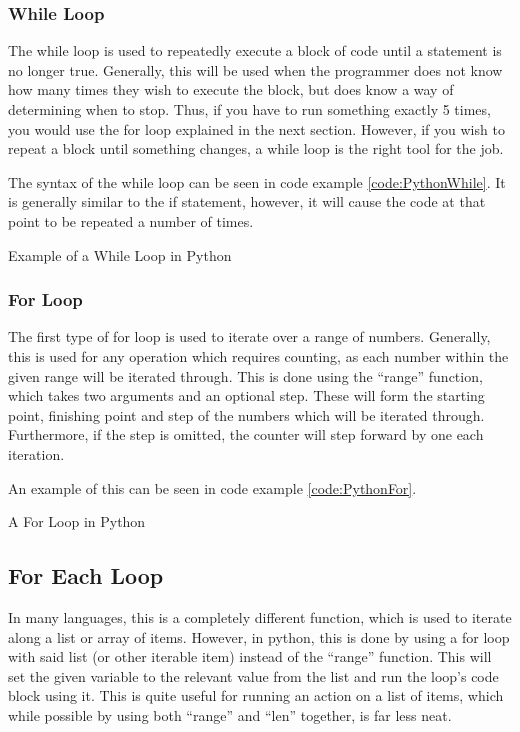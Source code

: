 			\subsubsection{While Loop}
				The while loop is used to repeatedly execute a block of code until a statement is no longer true.
				Generally, this will be used when the programmer does not know how many times they wish to execute the block,
				but does know a way of determining when to stop.
				Thus, if you have to run something exactly 5 times, you would use the for loop explained in the next section.
				However, if you wish to repeat a block until something changes, a while loop is the right tool for the job.

				The syntax of the while loop can be seen in code example \ref{code:PythonWhile}.
				It is generally similar to the if statement, however, it will cause the code at that point to be repeated a number of times.
				\begin{code}
					\caption{Example of a While Loop in Python}
					\label{code:PythonWhile}
				\end{code}

			\subsubsection{For Loop}
				The first type of for loop is used to iterate over a range of numbers.
				Generally, this is used for any operation which requires counting, as each number within the given range will be iterated through.
				This is done using the ``range'' function, which takes two arguments and an optional step.
				These will form the starting point, finishing point and step of the numbers which will be iterated through.
				Furthermore, if the step is omitted, the counter will step forward by one each iteration.

				An example of this can be seen in code example \ref{code:PythonFor}.
				\begin{code}
					\pcode{./PythonFor.py}
					\caption{A For Loop in Python}
					\label{code:PythonFor}
				\end{code}

			\subsection{For Each Loop}
				In many languages, this is a completely different function, which is used to iterate along a list or array of items.
				However, in python, this is done by using a for loop with said list (or other iterable item) instead of the ``range'' function.
				This will set the given variable to the relevant value from the list and run the loop's code block using it.
				This is quite useful for running an action on a list of items, which while possible by using both ``range'' and ``len'' together, is far less neat.

